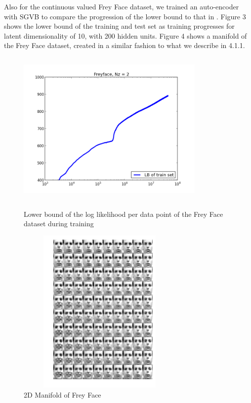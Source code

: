 \documentclass{article}
\begin{document}
Also for the continuous valued Frey Face dataset, we trained an auto-encoder with SGVB to compare the progression of the lower bound to that in \cite{kingma2013auto}. Figure 3 shows the lower bound of the training and test set as training progresses for latent dimensionality of 10, with 200 hidden units. Figure 4 shows a manifold of the Frey Face dataset, created in a similar fashion to what we describe in 4.1.1.

\begin{figure}[htb]
\centering
\begin{minipage}{0.5\textwidth}
\includegraphics[height=3in,width=3.6in]{lowerboundFF.png}
\caption{Lower bound of the log likelihood per data point of the Frey Face dataset during training}
\end{minipage}%
\centering
\begin{minipage}{0.5\textwidth}
\includegraphics[height=3.2in,width=3.2in]{manifoldFF.png}\caption{2D Manifold of Frey Face}
\end{minipage}
\end{figure}
\end{document}
